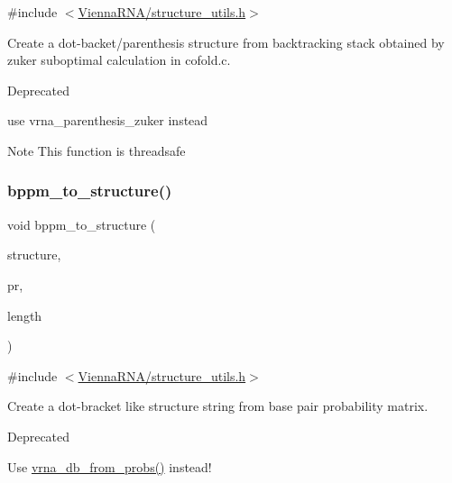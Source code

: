 {\ttfamily \#include $<$\hyperlink{structure__utils_8h}{Vienna\+R\+N\+A/structure\+\_\+utils.\+h}$>$}



Create a dot-\/backet/parenthesis structure from backtracking stack obtained by zuker suboptimal calculation in cofold.\+c. 

\begin{DoxyRefDesc}{Deprecated}
\item[\hyperlink{deprecated__deprecated000148}{Deprecated}]use vrna\+\_\+parenthesis\+\_\+zuker instead\end{DoxyRefDesc}


\begin{DoxyNote}{Note}
This function is threadsafe 
\end{DoxyNote}
\mbox{\label{group__struct__utils_ga129d81c4a1ead793c5b2311333e03dfa}} 
\subsubsection{\texorpdfstring{bppm\+\_\+to\+\_\+structure()}{bppm\_to\_structure()}}
{\footnotesize\ttfamily void bppm\+\_\+to\+\_\+structure (\begin{DoxyParamCaption}\item[{char $\ast$}]{structure,  }\item[{\hyperlink{group__data__structures_ga31125aeace516926bf7f251f759b6126}{F\+L\+T\+\_\+\+O\+R\+\_\+\+D\+BL} $\ast$}]{pr,  }\item[{unsigned int}]{length }\end{DoxyParamCaption})}



{\ttfamily \#include $<$\hyperlink{structure__utils_8h}{Vienna\+R\+N\+A/structure\+\_\+utils.\+h}$>$}



Create a dot-\/bracket like structure string from base pair probability matrix. 

\begin{DoxyRefDesc}{Deprecated}
\item[\hyperlink{deprecated__deprecated000149}{Deprecated}]Use \hyperlink{group__struct__utils_ga0c28c410a5ab22d6ab9c77a84e8d5b44}{vrna\+\_\+db\+\_\+from\+\_\+probs()} instead! \end{DoxyRefDesc}
\mbox{\label{group__struct__utils_ga49962ad6242b8c628de6ca16bb831c1d}} 

